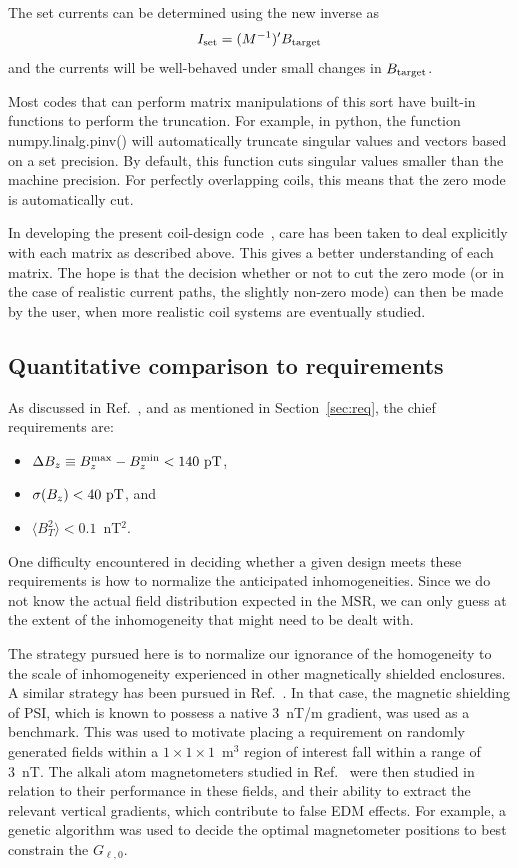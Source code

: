 \documentclass[preprint,12pt]{elsarticle}
\begin{document}
The set currents can be determined using the new inverse as
\begin{equation}
  I_{\rm set}=(M^{-1})'B_{\rm target}
\end{equation}
and the currents will be well-behaved under small changes in $B_{\rm
  target}$.

Most codes that can perform matrix manipulations of this sort have
built-in functions to perform the truncation.  For example, in python,
the function numpy.linalg.pinv() will automatically truncate singular
values and vectors based on a set precision.  By default, this
function cuts singular values smaller than the machine precision.  For
perfectly overlapping coils, this means that the zero mode is
automatically cut.

In developing the present coil-design code~\cite{bib:code}, care has
been taken to deal explicitly with each matrix as described above.
This gives a better understanding of each matrix.  The hope is that
the decision whether or not to cut the zero mode (or in the case of
realistic current paths, the slightly non-zero mode) can then be made
by the user, when more realistic coil systems are eventually studied.

\subsection{Quantitative comparison to requirements}

As discussed in Ref.~\cite{bib:jeffnote}, and as mentioned in
Section~\ref{sec:req}, the chief requirements are:
\begin{itemize}
\item $\Delta B_z\equiv B_z^{\rm max}-B_z^{\rm min}<140~{\rm pT}$,
\item $\sigma(B_z)<40~{\rm pT}$, and
\item $\langle B_T^2\rangle<0.1$~nT$^2$.
\end{itemize}

One difficulty encountered in deciding whether a given design meets
these requirements is how to normalize the anticipated
inhomogeneities.  Since we do not know the actual field distribution
expected in the MSR, we can only guess at the extent of the
inhomogeneity that might need to be dealt with.

The strategy pursued here is to normalize our ignorance of the
homogeneity to the scale of inhomogeneity experienced in other
magnetically shielded enclosures.  A similar strategy has been pursued
in Ref.~\cite{bib:wkthesis}.  In that case, the magnetic shielding of
PSI, which is known to possess a native 3~nT/m gradient, was used as a
benchmark.  This was used to motivate placing a requirement on
randomly generated fields within a $1\times 1\times 1$~m$^3$ region of
interest fall within a range of 3~nT.  The alkali atom magnetometers
studied in Ref.~\cite{bib:wkthesis} were then studied in relation to
their performance in these fields, and their ability to extract the
relevant vertical gradients, which contribute to false EDM effects.
For example, a genetic algorithm was used to decide the optimal
magnetometer positions to best constrain the $G_{\ell,0}$.
\end{document}
